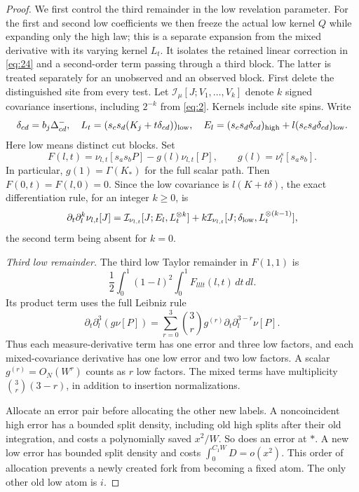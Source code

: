 \begin{proof}
We first control the third remainder in the low revelation parameter.
For the first and second low coefficients we then freeze the actual
low kernel \(Q\) while expanding only the high law; this is a separate
expansion from the mixed derivative with its varying kernel \(L_t\).
It isolates the retained linear correction in \eqref{eq:24} and a
second-order term passing through a third block. The latter is treated
separately for an unobserved and an observed block.
First delete the distinguished site from every test.
Let \(\mathcal I_\mu[J;V_1,\ldots,V_k]\) denote
\(k\) signed covariance insertions, including
\(2^{-k}\) from \eqref{eq:2}. Kernels include site spins.
Write
\[
 \delta_{cd}=b_j\Delta^-_{cd},\quad
 L_t=(s_cs_d(K_j+t\delta_{cd}))_{\rm low},\quad
 E_l=(s_cs_d\delta_{cd})_{\rm high}
                      +l(s_cs_d\delta_{cd})_{\rm low}.
\]
Here low means distinct cut blocks. Set
\[
 F(l,t)=\nu_{l,t}[s_as_bP]-g(l)\nu_{l,t}[P],\qquad
 g(l)=\nu_l^s[s_as_b].
\]
In particular, \(g(1)=\Gamma(K_*)\) for the full scalar path.
Then \(F(0,t)=F(l,0)=0\). Since the low covariance is
\(l(K+t\delta)\), the exact differentiation rule, for an integer
\(k\ge0\), is
\[
 \partial_t\partial_l^k\nu_{l,t}[J]
 =\mathcal I_{\nu_{l,t}}[J;E_l,L_t^{\otimes k}]
  +k\mathcal I_{\nu_{l,t}}
                    [J;\delta_{\rm low},L_t^{\otimes(k-1)}],
\]
the second term being absent for \(k=0\).

\emph{Third low remainder.}
The third low Taylor remainder in \(F(1,1)\) is
\[
 \frac12\int_0^1(1-l)^2\int_0^1 F_{lllt}(l,t)\,dt\,dl .
\]
Its product term uses the full Leibniz rule
\[
 \partial_t\partial_l^3(g\nu[P])
   =\sum_{r=0}^3\binom3r g^{(r)}
                  \partial_t\partial_l^{3-r}\nu[P].
\]
Thus each measure-derivative term has one error and
three low factors, and each mixed-covariance derivative
has one low error and two low factors. A scalar
\(g^{(r)}=O_N(W^r)\) counts as \(r\) low factors.
The mixed terms have multiplicity
\(\binom3r(3-r)\), in addition to insertion normalizations.

Allocate an error pair before allocating the other
new labels. A noncoincident high error has a bounded
split density, including old high splits after their
old integration, and costs a polynomially saved
\(x^2/W\). So does an error at \(*\).
A new low error has bounded split density and costs
\(\int_0^{C_1W}D=o(x^2)\). This order of allocation
prevents a newly created fork from becoming a fixed
atom. The only other old low atom is \(i\).


\end{proof}

